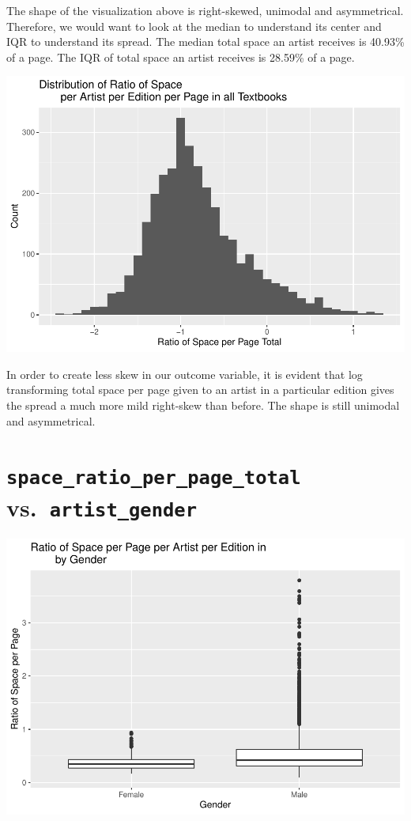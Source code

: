 \documentclass[
  letterpaper,
  DIV=11,
  numbers=noendperiod]{scrreprt}
\begin{document}
The shape of the visualization above is right-skewed, unimodal and
asymmetrical. Therefore, we would want to look at the median to
understand its center and IQR to understand its spread. The median total
space an artist receives is 40.93\% of a page. The IQR of total space an
artist receives is 28.59\% of a page.

\includegraphics{Chapter1/Chapter1_files/figure-pdf/logspaceratioperpagetotal-1.pdf}

In order to create less skew in our outcome variable, it is evident that
log transforming total space per page given to an artist in a particular
edition gives the spread a much more mild right-skew than before. The
shape is still unimodal and asymmetrical.

\hypertarget{space_ratio_per_page_total-vs.-artist_gender}{%
\section{\texorpdfstring{\texttt{space\_ratio\_per\_page\_total}
vs.~\texttt{artist\_gender}}{space\_ratio\_per\_page\_total vs.~artist\_gender}}\label{space_ratio_per_page_total-vs.-artist_gender}}

\includegraphics{Chapter1/Chapter1_files/figure-pdf/genderallbooks-1.pdf}
\end{document}
